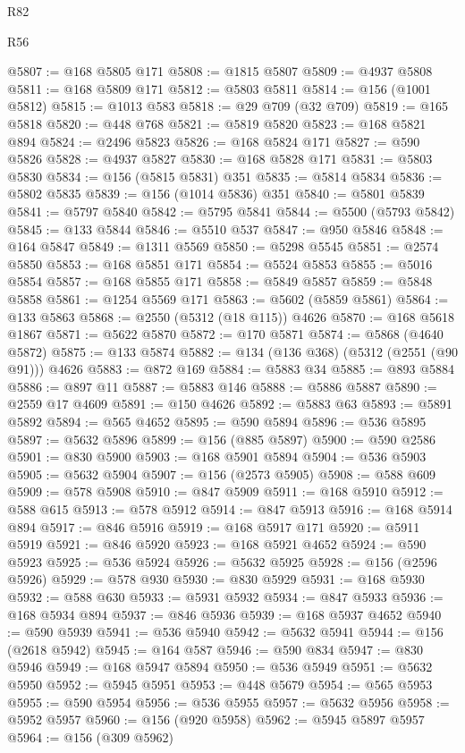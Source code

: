 \begin{lexlean}{R82}
\begin{lexlean}{R56}
\begin{coremodule}
{{{{{{{{{{{{{{{{{{{{{{{{{{{{{{{{{{{{{{{{{{{{{{{{{{{{{{{{{{{{{{{{{{{{{{{{{{{{{{{{{{{{{{{{{{{{{{{{{{{{{{{{{{{{{{{{{{{{{{{{{{{{{{{{{{{{{{{{{{{{{{{{{{{{{{{{{{{{{{{{{{{{{{{{{{{{{{{{{{{{{{{{{{{{{{{{{{{{{{{{{{{{{{{{{{{@5807 := @168 @5805 @171
@5808 := @1815 @5807
@5809 := @4937 @5808
@5811 := @168 @5809 @171
@5812 := @5803 @5811
@5814 := @156 (@1001 @5812)
@5815 := @1013 @583
@5818 := @29 @709 (@32 @709)
@5819 := @165 @5818
@5820 := @448 @768
@5821 := @5819 @5820
@5823 := @168 @5821 @894
@5824 := @2496 @5823
@5826 := @168 @5824 @171
@5827 := @590 @5826
@5828 := @4937 @5827
@5830 := @168 @5828 @171
@5831 := @5803 @5830
@5834 := @156 (@5815 @5831) @351
@5835 := @5814 @5834
@5836 := @5802 @5835
@5839 := @156 (@1014 @5836) @351
@5840 := @5801 @5839
@5841 := @5797 @5840
@5842 := @5795 @5841
@5844 := @5500 (@5793 @5842)
@5845 := @133 @5844
@5846 := @5510 @537
@5847 := @950 @5846
@5848 := @164 @5847
@5849 := @1311 @5569
@5850 := @5298 @5545
@5851 := @2574 @5850
@5853 := @168 @5851 @171
@5854 := @5524 @5853
@5855 := @5016 @5854
@5857 := @168 @5855 @171
@5858 := @5849 @5857
@5859 := @5848 @5858
@5861 := @1254 @5569 @171
@5863 := @5602 (@5859 @5861)
@5864 := @133 @5863
@5868 := @2550 (@5312 (@18 @115)) @4626
@5870 := @168 @5618 @1867
@5871 := @5622 @5870
@5872 := @170 @5871
@5874 := @5868 (@4640 @5872)
@5875 := @133 @5874
@5882 := @134 (@136 @368) (@5312 (@2551 (@90 @91))) @4626
@5883 := @872 @169
@5884 := @5883 @34
@5885 := @893 @5884
@5886 := @897 @11
@5887 := @5883 @146
@5888 := @5886 @5887
@5890 := @2559 @17 @4609
@5891 := @150 @4626
@5892 := @5883 @63
@5893 := @5891 @5892
@5894 := @565 @4652
@5895 := @590 @5894
@5896 := @536 @5895
@5897 := @5632 @5896
@5899 := @156 (@885 @5897)
@5900 := @590 @2586
@5901 := @830 @5900
@5903 := @168 @5901 @5894
@5904 := @536 @5903
@5905 := @5632 @5904
@5907 := @156 (@2573 @5905)
@5908 := @588 @609
@5909 := @578 @5908
@5910 := @847 @5909
@5911 := @168 @5910
@5912 := @588 @615
@5913 := @578 @5912
@5914 := @847 @5913
@5916 := @168 @5914 @894
@5917 := @846 @5916
@5919 := @168 @5917 @171
@5920 := @5911 @5919
@5921 := @846 @5920
@5923 := @168 @5921 @4652
@5924 := @590 @5923
@5925 := @536 @5924
@5926 := @5632 @5925
@5928 := @156 (@2596 @5926)
@5929 := @578 @930
@5930 := @830 @5929
@5931 := @168 @5930
@5932 := @588 @630
@5933 := @5931 @5932
@5934 := @847 @5933
@5936 := @168 @5934 @894
@5937 := @846 @5936
@5939 := @168 @5937 @4652
@5940 := @590 @5939
@5941 := @536 @5940
@5942 := @5632 @5941
@5944 := @156 (@2618 @5942)
@5945 := @164 @587
@5946 := @590 @834
@5947 := @830 @5946
@5949 := @168 @5947 @5894
@5950 := @536 @5949
@5951 := @5632 @5950
@5952 := @5945 @5951
@5953 := @448 @5679
@5954 := @565 @5953
@5955 := @590 @5954
@5956 := @536 @5955
@5957 := @5632 @5956
@5958 := @5952 @5957
@5960 := @156 (@920 @5958)
@5962 := @5945 @5897 @5957
@5964 := @156 (@309 @5962)
}}}}}}}}}}}}}}}}}}}}}}}}}}}}}}}}}}}}}}}}}}}}}}}}}}}}}}}}}}}}}}}}}}}}}}}}}}}}}}}}}}}}}}}}}}}}}}}}}}}}}}}}}}}}}}}}}}}}}}}}}}}}}}}}}}}}}}}}}}}}}}}}}}}}}}}}}}}}}}}}}}}}}}}}}}}}}}}}}}}}}}}}}}}}}}}}}}}}}}}}}}}}}}}}}}}
\end{coremodule}
\end{lexlean}
\end{lexlean}
